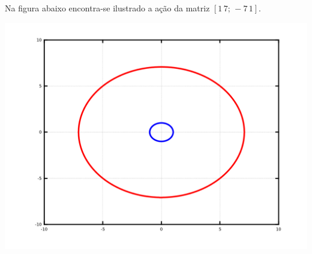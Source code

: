 \documentclass[a4paper,12pt, leqno, answers]{exam}
\begin{document}
\begin{questions}
\begin{solution}
        Na figura abaixo encontra-se ilustrado a a\c{c}\~{a}o da matriz $[1 \, 7; \, -7 \, 1]$.
        \begin{center}
            \includegraphics[width=.5\textwidth]{lista11_esfa.png}
        \end{center}
    \end{solution}


\end{questions}
\end{document}
